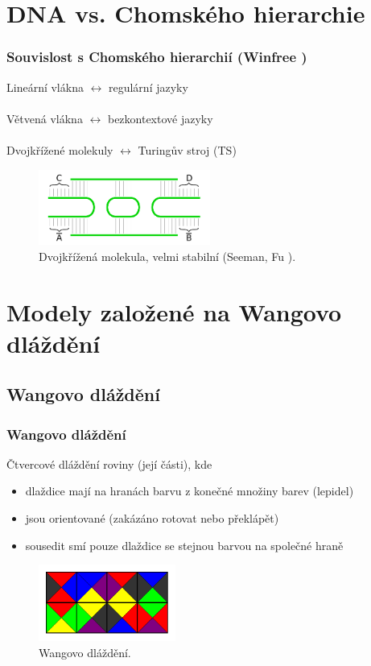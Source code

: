 \documentclass[10pt]{beamer}
\theoremstyle{definition}
\theoremstyle{remark}
\begin{document}
\section{DNA vs. Chomského hierarchie}
\begin{frame}
\frametitle{Souvislost s Chomského hierarchií (Winfree \cite{winfree_phd})}
	Lineární vlákna $\leftrightarrow$ regulární jazyky\\~\\
	Větvená vlákna $\leftrightarrow$ bezkontextové jazyky\\~\\
	Dvojkřížené molekuly $\leftrightarrow$ Turingův stroj (TS)
	\begin{figure}[h]
	\begin{center}
		\includegraphics[width=0.502\textwidth]{../figures/strand_types/double_crossover.pdf} %
		\caption{Dvojkřížená molekula, velmi stabilní (Seeman, Fu \cite{seeman93}).}
	\end{center}
	\end{figure}
\end{frame}

\section{Modely založené na Wangovo dláždění}
\subsection{Wangovo dláždění}
\begin{frame}
\frametitle{Wangovo dláždění}
	Čtvercové dláždění roviny (její části), kde
	\begin{itemize}
		\item dlaždice mají na hranách barvu z konečné množiny barev (lepidel)
		\item jsou orientované (zakázáno rotovat nebo překlápět)
		\item sousedit smí pouze dlaždice se stejnou barvou na společné hraně
	\end{itemize}
	\begin{figure}[h]
	\begin{center}
		\includegraphics[width=0.4\textwidth]{../figures/wang_tiling/wang_tiling.pdf} %
		\caption{Wangovo dláždění.}
	\end{center}
	\end{figure}
\end{frame}
\end{document}
